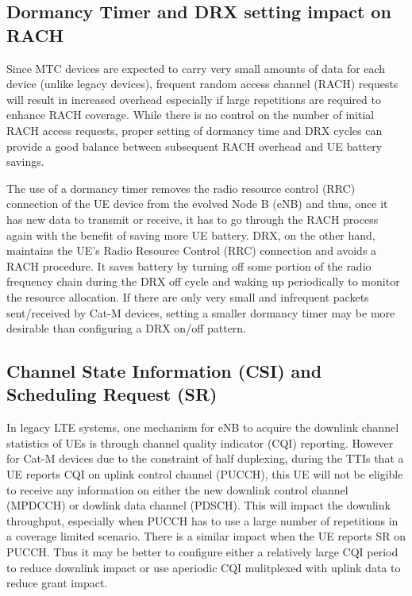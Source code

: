 \documentclass[conference,compsoc]{IEEEtran}
\begin{document}
\subsection{Dormancy Timer and DRX setting impact on RACH}
 Since MTC devices are expected to carry very small amounts of data for each device (unlike legacy devices), frequent random access channel (RACH) requests will result in increased overhead especially if large repetitions are required to enhance RACH coverage. While there is no control on the number of initial RACH access requests, proper setting of dormancy time and DRX cycles can provide a good balance between subsequent RACH overhead and UE battery savings.

 The use of a dormancy timer removes the radio resource control (RRC) connection of the UE device from the evolved Node B (eNB) and thus, once it has new data to transmit or receive, it has to go through the RACH process again with the benefit of saving more UE battery. DRX, on the other hand, maintains the UE’s Radio Resource Control (RRC) connection and avoids  a RACH procedure. It saves battery by turning off some portion of the radio frequency chain during the DRX off cycle and waking up periodically to monitor the resource allocation. If there are only very small and infrequent packets sent/received by Cat-M devices, setting a smaller dormancy timer may be more desirable than configuring a DRX on/off pattern.

\subsection{Channel State Information (CSI) and Scheduling Request (SR)}
In legacy LTE systems, one mechanism for eNB to acquire the downlink channel statistics of UEs is through channel quality indicator (CQI) reporting. However for Cat-M devices due to the constraint of half duplexing, during the TTIs that a UE reports CQI on uplink control channel (PUCCH), this UE will not be eligible to receive any information on either the new downlink control channel (MPDCCH) or dowlink data channel (PDSCH). This will impact the downlink throughput, especially when PUCCH has to use a large number of repetitions in a coverage limited scenario. There is a similar impact when the UE reports SR on PUCCH. Thus it may be better to configure either a relatively large CQI period to reduce downlink impact or use aperiodic CQI mulitplexed with uplink data to reduce grant impact.
\end{document}

